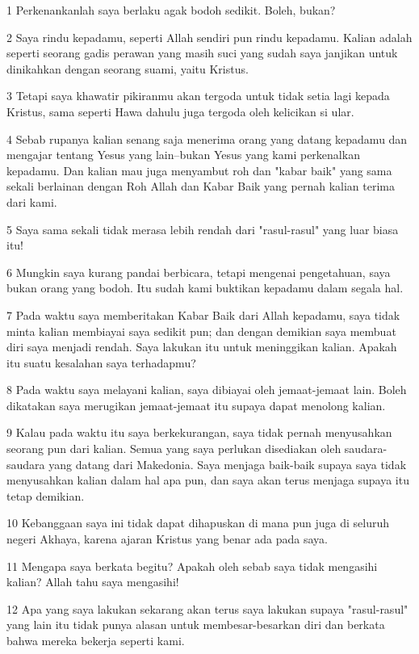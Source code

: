 \par 1 Perkenankanlah saya berlaku agak bodoh sedikit. Boleh, bukan?
\par 2 Saya rindu kepadamu, seperti Allah sendiri pun rindu kepadamu. Kalian adalah seperti seorang gadis perawan yang masih suci yang sudah saya janjikan untuk dinikahkan dengan seorang suami, yaitu Kristus.
\par 3 Tetapi saya khawatir pikiranmu akan tergoda untuk tidak setia lagi kepada Kristus, sama seperti Hawa dahulu juga tergoda oleh kelicikan si ular.
\par 4 Sebab rupanya kalian senang saja menerima orang yang datang kepadamu dan mengajar tentang Yesus yang lain--bukan Yesus yang kami perkenalkan kepadamu. Dan kalian mau juga menyambut roh dan "kabar baik" yang sama sekali berlainan dengan Roh Allah dan Kabar Baik yang pernah kalian terima dari kami.
\par 5 Saya sama sekali tidak merasa lebih rendah dari "rasul-rasul" yang luar biasa itu!
\par 6 Mungkin saya kurang pandai berbicara, tetapi mengenai pengetahuan, saya bukan orang yang bodoh. Itu sudah kami buktikan kepadamu dalam segala hal.
\par 7 Pada waktu saya memberitakan Kabar Baik dari Allah kepadamu, saya tidak minta kalian membiayai saya sedikit pun; dan dengan demikian saya membuat diri saya menjadi rendah. Saya lakukan itu untuk meninggikan kalian. Apakah itu suatu kesalahan saya terhadapmu?
\par 8 Pada waktu saya melayani kalian, saya dibiayai oleh jemaat-jemaat lain. Boleh dikatakan saya merugikan jemaat-jemaat itu supaya dapat menolong kalian.
\par 9 Kalau pada waktu itu saya berkekurangan, saya tidak pernah menyusahkan seorang pun dari kalian. Semua yang saya perlukan disediakan oleh saudara-saudara yang datang dari Makedonia. Saya menjaga baik-baik supaya saya tidak menyusahkan kalian dalam hal apa pun, dan saya akan terus menjaga supaya itu tetap demikian.
\par 10 Kebanggaan saya ini tidak dapat dihapuskan di mana pun juga di seluruh negeri Akhaya, karena ajaran Kristus yang benar ada pada saya.
\par 11 Mengapa saya berkata begitu? Apakah oleh sebab saya tidak mengasihi kalian? Allah tahu saya mengasihi!
\par 12 Apa yang saya lakukan sekarang akan terus saya lakukan supaya "rasul-rasul" yang lain itu tidak punya alasan untuk membesar-besarkan diri dan berkata bahwa mereka bekerja seperti kami.
